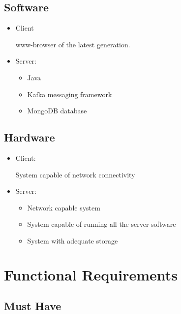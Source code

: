 \documentclass[twoside, english, draft]{Pflichtenheft}
\begin{document}
\subsection{Software}
\begin{itemize}
\item{Client}
\begin{itemize}
	www-browser of the latest generation.
\end{itemize}
	
\item{Server:}
\begin{itemize}
	\item{Java}
	\item{Kafka messaging framework}
	\item{MongoDB database}
\end{itemize}
\end{itemize}
	
\subsection{Hardware}
\begin{itemize}
\item{Client:}
\begin{itemize}
	System capable of network connectivity
\end{itemize}
	
\item{Server:}
\begin{itemize}
	\item{Network capable system}
	\item{System capable of running all the server-software}
	\item{System with adequate storage}
\end{itemize}

\end{itemize}

\section{Functional Requirements}
\subsection{Must Have}
\end{document}
